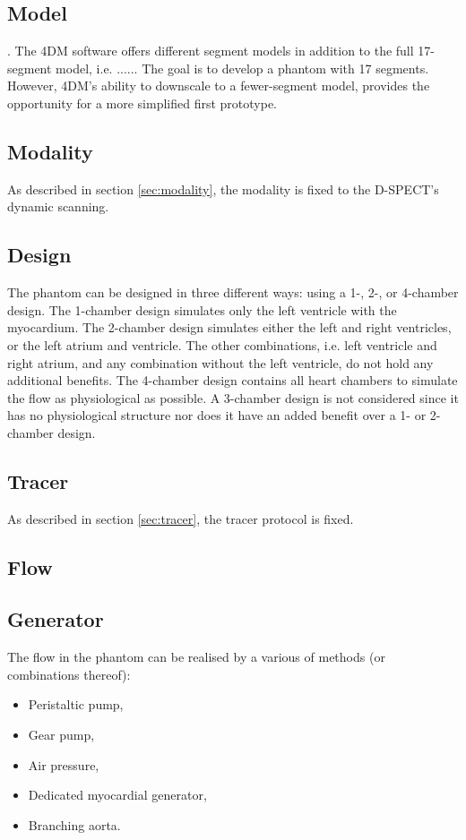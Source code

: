 \subsection*{Model}
.
The 4DM software offers different segment models in addition to the full 17-segment model, i.e. ...... The goal is to develop a phantom with 17 segments. However, 4DM's ability to downscale to a fewer-segment model, provides the opportunity for a more simplified first prototype.
\subsection{Modality}
As described in section \ref{sec:modality}, the modality is fixed to the D-SPECT's dynamic scanning.
\subsection{Design}
The phantom can be designed in three different ways: using a 1-, 2-, or 4-chamber design. The 1-chamber design simulates only the left ventricle with the myocardium. The 2-chamber design simulates either the left and right ventricles, or the left atrium and ventricle. The other combinations, i.e. left ventricle and right atrium, and any combination without the left ventricle, do not hold any additional benefits. The 4-chamber design contains all heart chambers to simulate the flow as physiological as possible. A 3-chamber design is not considered since it has no physiological structure nor does it have an added benefit over a 1- or 2-chamber design.
\subsection{Tracer}
As described in section \ref{sec:tracer}, the tracer protocol is fixed.
\subsection{Flow}
\subsection*{Generator}
The flow in the phantom can be realised by a various of methods (or combinations thereof):
\begin{itemize} [noitemsep]
	\item Peristaltic pump,
	\item Gear pump,
	\item Air pressure,
	\item Dedicated myocardial generator,
	\item Branching aorta.
\end{itemize}
